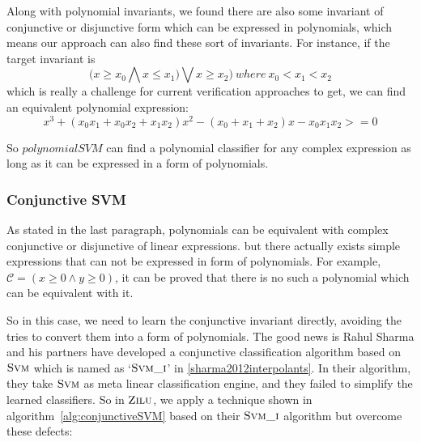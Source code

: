 Along with polynomial invariants, we found there are also some invariant of conjunctive or disjunctive form which can be expressed in polynomials,
which means our approach can also find these sort of invariants.
For instance, if the target invariant is 
$$\big(x \ge x_0 \bigwedge x \le x_1) \bigvee x \ge x_2\big) \ where\ x_0 < x_1 < x_2$$
which is really a challenge for current verification approaches to get,
we can find an equivalent polynomial expression:
$$x^3 + (x_0x_1 + x_0x_2 + x_1x_2)x^2 - (x_0 + x_1 + x_2)x - x_0x_1x_2 >= 0$$

So $polynomialSVM$ can find a polynomial classifier for any complex expression as long as it can be expressed in a form of polynomials.


\subsubsection{Conjunctive SVM}
As stated in the last paragraph, polynomials can be equivalent with complex conjunctive or disjunctive of linear expressions.
but there actually exists simple expressions that can not be expressed in form of polynomials.
For example, $\mathcal{C} = (x \ge 0 \wedge y \ge 0)$,
it can be proved that there is no such a polynomial which can be equivalent with it.

So in this case, we need to learn the conjunctive invariant directly, avoiding the tries to convert them into a form of polynomials.
The good news is Rahul Sharma and his partners have developed a conjunctive classification algorithm based on $\textsc{Svm}$
which is named as `$\textsc{Svm\_i}$' in \ref{sharma2012interpolants}.
In their algorithm, they take $\textsc{Svm}$ as meta linear classification engine, and they failed to simplify the learned classifiers.
So in $\textsc{Zilu}$, we apply a technique shown in algorithm~\ref{alg:conjunctiveSVM} based on their $\textsc{Svm\_i}$ algorithm but overcome these defects:

